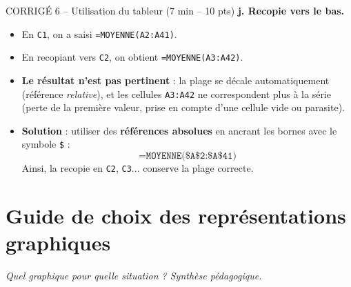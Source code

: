 \documentclass[11pt,a4paper]{article}
\begin{document}
\begin{epreuve}{CORRIGÉ 6 -- Utilisation du tableur \hfill \small (7 min -- 10 pts)}
\vspace{0.3cm}
\textbf{j. Recopie vers le bas.}
\begin{itemize}[leftmargin=*,itemsep=1pt]
  \item En \texttt{C1}, on a saisi \texttt{=MOYENNE(A2:A41)}.
  \item En recopiant vers \texttt{C2}, on obtient \texttt{=MOYENNE(A3:A42)}.
  \item \textbf{Le résultat n'est pas pertinent} : la plage se décale automatiquement (référence \emph{relative}), et les cellules \texttt{A3:A42} ne correspondent plus à la série (perte de la première valeur, prise en compte d'une cellule vide ou parasite).
  \item \textbf{Solution} : utiliser des \textbf{références absolues} en ancrant les bornes avec le symbole \texttt{\$} :
  $$\boxed{\texttt{=MOYENNE(\$A\$2:\$A\$41)}}$$
  Ainsi, la recopie en \texttt{C2}, \texttt{C3}... conserve la plage correcte.
\end{itemize}

\end{epreuve}

\newpage

\section*{\color{corrige}Guide de choix des représentations graphiques}
\emph{Quel graphique pour quelle situation ? Synthèse pédagogique.}

\vspace{0.3cm}
\end{document}
